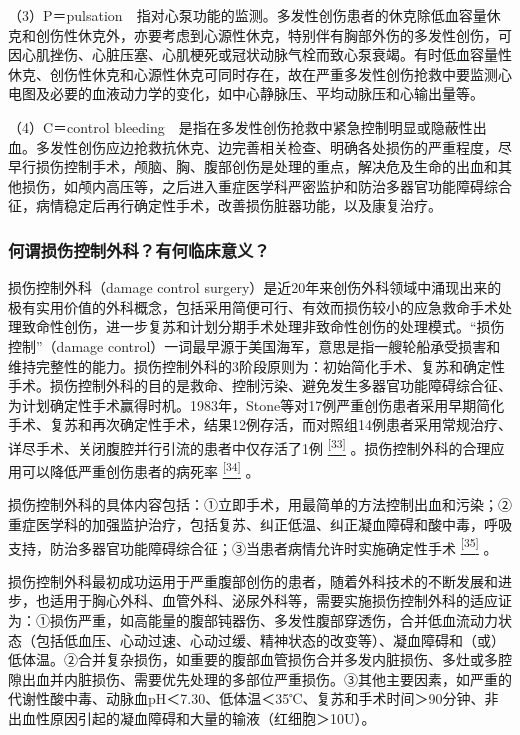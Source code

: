 （3）P＝pulsation　指对心泵功能的监测。多发性创伤患者的休克除低血容量休克和创伤性休克外，亦要考虑到心源性休克，特别伴有胸部外伤的多发性创伤，可因心肌挫伤、心脏压塞、心肌梗死或冠状动脉气栓而致心泵衰竭。有时低血容量性休克、创伤性休克和心源性休克可同时存在，故在严重多发性创伤抢救中要监测心电图及必要的血液动力学的变化，如中心静脉压、平均动脉压和心输出量等。

（4）C＝control
bleeding　是指在多发性创伤抢救中紧急控制明显或隐蔽性出血。多发性创伤应边抢救抗休克、边完善相关检查、明确各处损伤的严重程度，尽早行损伤控制手术，颅脑、胸、腹部创伤是处理的重点，解决危及生命的出血和其他损伤，如颅内高压等，之后进入重症医学科严密监护和防治多器官功能障碍综合征，病情稳定后再行确定性手术，改善损伤脏器功能，以及康复治疗。

\subsubsection{何谓损伤控制外科？有何临床意义？}

损伤控制外科（damage control
surgery）是近20年来创伤外科领域中涌现出来的极有实用价值的外科概念，包括采用简便可行、有效而损伤较小的应急救命手术处理致命性创伤，进一步复苏和计划分期手术处理非致命性创伤的处理模式。“损伤控制”（damage
control）一词最早源于美国海军，意思是指一艘轮船承受损害和维持完整性的能力。损伤控制外科的3阶段原则为：初始简化手术、复苏和确定性手术。损伤控制外科的目的是救命、控制污染、避免发生多器官功能障碍综合征、为计划确定性手术赢得时机。1983年，Stone等对17例严重创伤患者采用早期简化手术、复苏和再次确定性手术，结果12例存活，而对照组14例患者采用常规治疗、详尽手术、关闭腹腔并行引流的患者中仅存活了1例
\protect\hyperlink{text00024.htmlux5cux23ch33-23}{\textsuperscript{{[}33{]}}}
。损伤控制外科的合理应用可以降低严重创伤患者的病死率
\protect\hyperlink{text00024.htmlux5cux23ch34-23}{\textsuperscript{{[}34{]}}}
。

损伤控制外科的具体内容包括：①立即手术，用最简单的方法控制出血和污染；②重症医学科的加强监护治疗，包括复苏、纠正低温、纠正凝血障碍和酸中毒，呼吸支持，防治多器官功能障碍综合征；③当患者病情允许时实施确定性手术
\protect\hyperlink{text00024.htmlux5cux23ch35-23}{\textsuperscript{{[}35{]}}}
。

损伤控制外科最初成功运用于严重腹部创伤的患者，随着外科技术的不断发展和进步，也适用于胸心外科、血管外科、泌尿外科等，需要实施损伤控制外科的适应证为：①损伤严重，如高能量的腹部钝器伤、多发性腹部穿透伤，合并低血流动力状态（包括低血压、心动过速、心动过缓、精神状态的改变等）、凝血障碍和（或）低体温。②合并复杂损伤，如重要的腹部血管损伤合并多发内脏损伤、多灶或多腔隙出血并内脏损伤、需要优先处理的多部位严重损伤。③其他主要因素，如严重的代谢性酸中毒、动脉血pH＜7.30、低体温＜35℃、复苏和手术时间＞90分钟、非出血性原因引起的凝血障碍和大量的输液（红细胞＞10U）。

